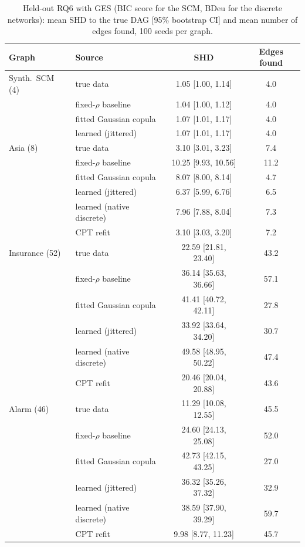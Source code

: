 \documentclass[
  english,
  class=report,
  accentcolor=2c,
  marginpar=false,
  parskip=half-,
  fontsize=11pt,
  ruledheaders=false,
  pdfa=false,
  IMRAD=false,
  thesis={type=master}
]{tudapub}
\begin{document}
\begin{table}[ht]
\caption{Held-out RQ6 with GES (BIC score for the SCM, BDeu for the discrete networks): mean SHD to the true DAG [95\% bootstrap CI] and mean number of edges found, 100 seeds per graph.}
\label{tab:shd-ges}
\centering
\small
\begin{tabular}{llcc}
\toprule
\textbf{Graph} & \textbf{Source} & \textbf{SHD} & \textbf{Edges found} \\
\midrule
Synth.\ SCM (4) & true data & 1.05 [1.00, 1.14] & 4.0 \\
 & fixed-$\rho$ baseline & 1.04 [1.00, 1.12] & 4.0 \\
 & fitted Gaussian copula & 1.07 [1.01, 1.17] & 4.0 \\
 & learned (jittered) & 1.07 [1.01, 1.17] & 4.0 \\
\addlinespace
Asia (8) & true data & 3.10 [3.01, 3.23] & 7.4 \\
 & fixed-$\rho$ baseline & 10.25 [9.93, 10.56] & 11.2 \\
 & fitted Gaussian copula & 8.07 [8.00, 8.14] & 4.7 \\
 & learned (jittered) & 6.37 [5.99, 6.76] & 6.5 \\
 & learned (native discrete) & 7.96 [7.88, 8.04] & 7.3 \\
 & CPT refit & 3.10 [3.03, 3.20] & 7.2 \\
\addlinespace
Insurance (52) & true data & 22.59 [21.81, 23.40] & 43.2 \\
 & fixed-$\rho$ baseline & 36.14 [35.63, 36.66] & 57.1 \\
 & fitted Gaussian copula & 41.41 [40.72, 42.11] & 27.8 \\
 & learned (jittered) & 33.92 [33.64, 34.20] & 30.7 \\
 & learned (native discrete) & 49.58 [48.95, 50.22] & 47.4 \\
 & CPT refit & 20.46 [20.04, 20.88] & 43.6 \\
\addlinespace
Alarm (46) & true data & 11.29 [10.08, 12.55] & 45.5 \\
 & fixed-$\rho$ baseline & 24.60 [24.13, 25.08] & 52.0 \\
 & fitted Gaussian copula & 42.73 [42.15, 43.25] & 27.0 \\
 & learned (jittered) & 36.32 [35.26, 37.32] & 32.9 \\
 & learned (native discrete) & 38.59 [37.90, 39.29] & 59.7 \\
 & CPT refit & 9.98 [8.77, 11.23] & 45.7 \\
\bottomrule
\end{tabular}
\end{table}
\end{document}
